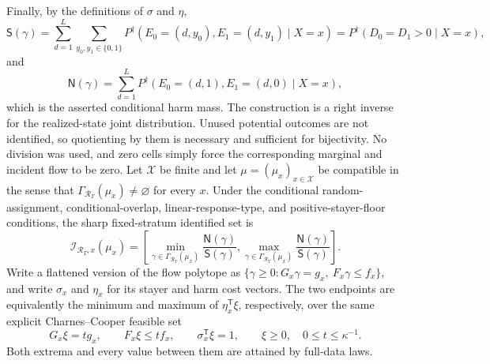 Finally, by the definitions of \(\sigma\) and \(\eta\),
\[\mathsf S(\gamma)=\sum_{d=1}^{L}\sum_{y_0,y_1\in\{0,1\}}P^{\dagger}(E_0=(d,y_0),E_1=(d,y_1)\mid X=x)
=P^{\dagger}(D_0=D_1>0\mid X=x),\]
and
\[\mathsf N(\gamma)=\sum_{d=1}^{L}P^{\dagger}(E_0=(d,1),E_1=(d,0)\mid X=x),\]
which is the asserted conditional harm mass.  The construction is a right inverse for the realized-state joint distribution.  Unused potential outcomes are not identified, so quotienting by them is necessary and sufficient for bijectivity.  No division was used, and zero cells simply force the corresponding marginal and incident flow to be zero.
Let \(\mathcal X\) be finite and let \(\mu=(\mu_x)_{x\in\mathcal X}\) be compatible in the sense that \(\Gamma_{\mathcal R_T}(\mu_x)\ne\varnothing\) for every \(x\).  Under the conditional random-assignment, conditional-overlap, linear-response-type, and positive-stayer-floor conditions, the sharp fixed-stratum identified set is
\[\mathcal I_{\mathcal R_T,x}(\mu_x)=\left[
\min_{\gamma\in\Gamma_{\mathcal R_T}(\mu_x)}\frac{\mathsf N(\gamma)}{\mathsf S(\gamma)},
\max_{\gamma\in\Gamma_{\mathcal R_T}(\mu_x)}\frac{\mathsf N(\gamma)}{\mathsf S(\gamma)}
\right].\]
Write a flattened version of the flow polytope as \(\{\gamma\ge0:G_x\gamma=g_x,\ F_x\gamma\le f_x\}\), and write \(\sigma_x\) and \(\eta_x\) for its stayer and harm cost vectors.  The two endpoints are equivalently the minimum and maximum of \(\eta_x^{\mathsf T}\xi\), respectively, over the same explicit Charnes--Cooper feasible set
\[G_x\xi=tg_x,\qquad F_x\xi\le tf_x,\qquad \sigma_x^{\mathsf T}\xi=1,\qquad \xi\ge0,\quad 0\le t\le\kappa^{-1}.\]
Both extrema and every value between them are attained by full-data laws.

